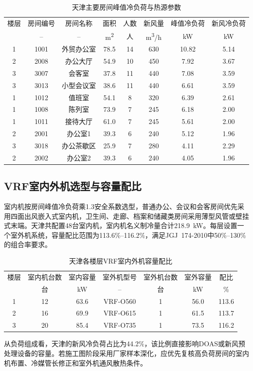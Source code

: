 \begin{table}[!htbp]
\centering
\caption{天津主要房间峰值冷负荷与热源参数}
\label{tab:tianjin-top-rooms}
\begin{tabular}{@{}cccccccc@{}}
\toprule
楼层 & 房间编号 & 房间名称 & 面积 & 人数 & 新风量 & 峰值冷负荷 & 新风冷负荷 \\
 & -- & -- & \si{m^2} & 人 & \si{m^3/h} & \si{kW} & \si{kW} \\
\midrule
1 & 1001 & 外贸办公室 & 78.5 & 14 & 630 & 10.82 & 5.14 \\
2 & 2008 & 办公大厅 & 54.9 & 10 & 450 & 7.92 & 3.67 \\
3 & 3007 & 会客室 & 37.8 & 11 & 440 & 7.08 & 3.59 \\
3 & 3013 & 小型会议室 & 38.6 & 11 & 440 & 6.61 & 3.59 \\
1 & 1012 & 值班室 & 54.1 & 8 & 320 & 6.39 & 2.61 \\
1 & 1008 & 陈列室 & 73.9 & 7 & 245 & 6.18 & 2.00 \\
1 & 1011 & 接待大厅 & 61.0 & 7 & 245 & 5.61 & 2.00 \\
2 & 2001 & 办公室1 & 39.3 & 6 & 240 & 5.12 & 1.96 \\
3 & 3018 & 办公茶歇区 & 25.9 & 7 & 280 & 4.11 & 2.29 \\
2 & 2002 & 办公室2 & 39.3 & 6 & 240 & 4.05 & 1.96 \\
\bottomrule
\end{tabular}
\end{table}

\subsection{VRF室内外机选型与容量配比}

室内机按房间峰值冷负荷乘1.3安全系数选型，普通办公、会议和会客房间优先采用四面出风嵌入式室内机，卫生间、走廊、档案和储藏类房间采用薄型风管或壁挂式末端。天津共配置48台室内机，室内机名义制冷量合计\SI{218.9}{kW}。每层设置一个室外机系统，容量配比范围为113.6\%--116.2\%，满足JGJ~174-2010中50\%--130\%的组合率要求。

\begin{table}[!htbp]
\centering
\caption{天津各楼层VRF室内外机容量配比}
\label{tab:tianjin-vrf-ratio}
\begin{tabular}{@{}ccccccc@{}}
\toprule
楼层 & 室内机台数 & 室内容量 & 室外机型号 & 室外机台数 & 室外容量 & 配比 \\
 & 台 & \si{kW} & -- & 台 & \si{kW} & \% \\
\midrule
1 & 12 & 63.6 & VRF-O560 & 1 & 56.0 & 113.6 \\
2 & 16 & 69.9 & VRF-O615 & 1 & 61.5 & 113.7 \\
3 & 20 & 85.4 & VRF-O735 & 1 & 73.5 & 116.2 \\
\bottomrule
\end{tabular}
\end{table}

从负荷组成看，天津的新风冷负荷占比为44.2\%，该比例直接影响DOAS或新风预处理设备的容量。若施工图阶段采用厂家样本深化，应优先复核高负荷房间的室内机布置、冷媒管长修正和室外机通风散热条件。
